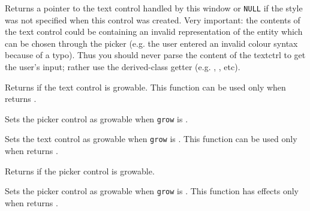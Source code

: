 
Returns a pointer to the text control handled by this window or \texttt{NULL} if the  style was not specified when this control was created.
Very important: the contents of the text control could be containing an invalid representation of the entity which can be chosen through the picker (e.g. the user entered an invalid colour syntax because of a typo). Thus you should never parse the content of the textctrl to get the user's input; rather use the derived-class getter (e.g. , , etc).


\label{wxpickerbaseistextctrlgrowable}


Returns \true if the text control is growable.
This function can be used only when  returns \true.


\label{wxpickerbasesetpickerctrlgrowable}


Sets the picker control as growable when {\tt grow} is \true.


\label{wxpickerbasesettextctrlgrowable}


Sets the text control as growable when {\tt grow} is \true.
This function can be used only when  returns \true.



\label{wxpickerbaseispickerctrlgrowable}


Returns \true if the picker control is growable.


\label{wxpickerbasesetpickerctrlgrowable}


Sets the picker control as growable when {\tt grow} is \true.
This function has effects only when  returns \true.

